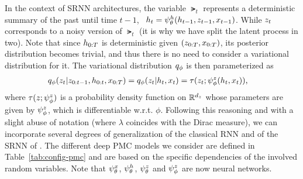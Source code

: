 In the context of SRNN architectures,
the variable $\lat_t$ represents a deterministic summary of the
past until time $t-1$, \ie~$h_t = \psi^{h}_{\theta}(h_{t-1},z_{t-1}, x_{t-1})$.
While $z_t$ corresponds to a
noisy version of $\lat_t$ (it is why we have split
the latent process in two).
Note that since $h_{0:T}$ is deterministic given $(z_{0:T},x_{0:T})$,
its posterior distribution becomes trivial, and thus 
there is no need to consider a variational distribution for it.
The variational distribution $q_\phi$ is  then parameterized as
\begin{align}
    \label{eq:pmc_qz}
    q_\phi(z_t | z_{0:t-1},  h_{0:t},x_{0:T}) &= 
    q_\phi(z_t | h_{t},x_{t})
    = \tau(z_t; \psi^{z}_{\phi} (h_{t},x_{t})) \text{,}
\end{align}
where $\tau(z;\psi^{z}_{\phi})$ is a probability density function
on $\mathbb{R}^{d_z}$ 
whose parameters are given by $\psi^{z}_{\phi}$, 
which is differentiable w.r.t. $\phi$.
Following this reasoning and with a slight abuse of notation 
(where $\lambda$ coincides with the Dirac measure), we can incorporate several
degrees of generalization of the classical RNN  and of the SRNN
of \citet{chung2015recurrent}. 
The different deep PMC models we consider are defined in 
Table~\ref{tab:config-pmc} 
and are based on the specific dependencies of the involved random variables. 
Note that $\psi^{x}_{\theta}$, $\psi^{h}_{\theta}$, $\psi^{z}_{\theta}$ and $\psi^{z}_{\phi}$ are now neural networks.

